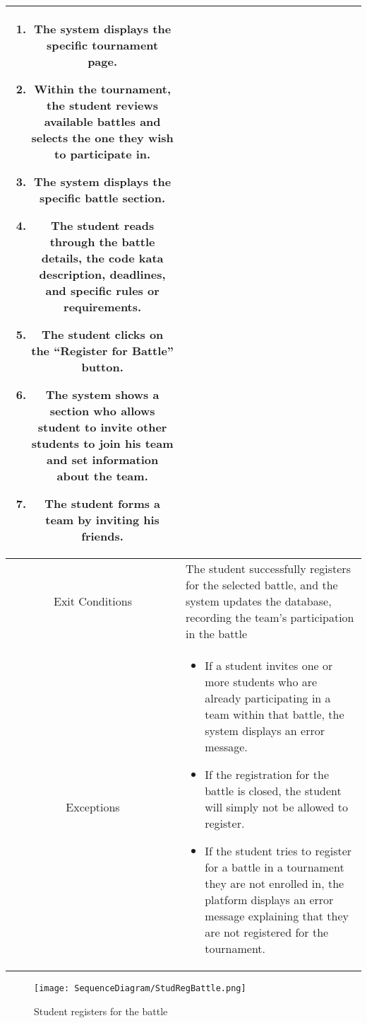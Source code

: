 \begin{longtable}{|c| p{10cm}|}
\begin{enumerate}
                                \item The system displays the specific tournament page.
                                \item Within the tournament, the student reviews available battles and selects the one they wish to participate in.
                                \item  The system displays the specific battle section.
                                \item The student reads through the battle details, the code kata description, deadlines, and specific rules or requirements. 
                                \item The student clicks on the “Register for Battle” button.
                                \item The system shows a section who allows student to invite other students to join his team and set information about the team.
                                \item  The student forms a team by inviting his friends.
                            \end{enumerate} \\
        \hline
            Exit Conditions &
                                     The student successfully registers for the selected battle, and the system updates the database, recording the team’s participation in the battle
                               \\
        \hline
            Exceptions & 
            \begin{itemize}
                \item If a student invites one or more students who are already participating in a team within that battle, the system displays an error message.
                \item If the registration for the battle is closed, the student will simply not be allowed to register.
                \item If the student tries to register for a battle in a tournament they are not enrolled in, the platform displays an error message explaining that they are not registered for the tournament.
                
            \end{itemize}\\
        \hline
    \end{longtable}
    \begin{figure}[H]
  \texttt{[image: SequenceDiagram/StudRegBattle.png]} 
  \caption{Student registers for the battle}
  \label{fig:immagine}
\end{figure}


